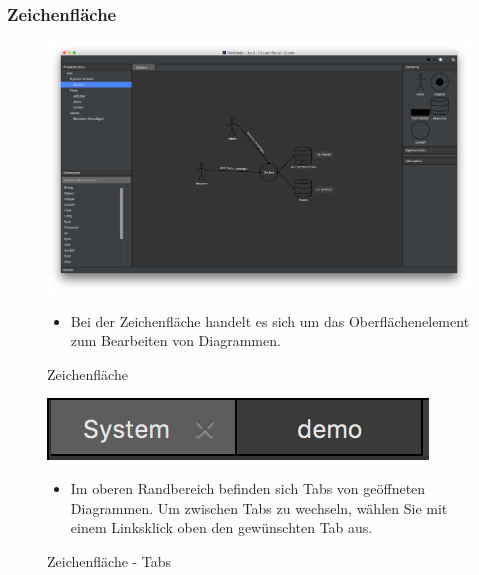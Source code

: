 \subsubsection{Zeichenfläche}

\begin{figure}[h!]
	\centering
	\includegraphics[width=1\textwidth]{Design_Dark.png}
	\caption{Zeichenfläche}	
\begin{itemize}	
\item Bei der Zeichenfläche handelt es sich um das Oberflächenelement zum Bearbeiten von Diagrammen. 
\end{itemize}
\end{figure}

\begin{figure}[h!]
	\centering
	\includegraphics[width=.4\textwidth]{Tabs.png}
	\caption{Zeichenfläche - Tabs}	
\begin{itemize}	
\item Im oberen Randbereich befinden sich Tabs von geöffneten Diagrammen. Um zwischen Tabs zu wechseln, wählen Sie mit einem Linksklick oben den gewünschten Tab aus.
\end{itemize}
\end{figure}

